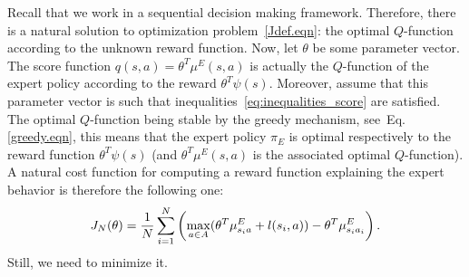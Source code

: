 \documentclass{article}
\begin{document}
Recall that we work in a sequential decision making framework.
Therefore, there is a natural solution to optimization
problem~\eqref{Jdef.eqn}: the optimal $Q$-function according to the
unknown reward function. Now, let $\theta$ be some parameter vector.
The score function $q(s,a) = \theta^T \mu^E(s,a)$ is actually the
$Q$-function of the expert policy according to the reward
$\theta^T\psi(s)$. Moreover, assume that this parameter vector is
such that inequalities~\eqref{eq:inequalities_score} are satisfied.
The optimal $Q$-function being stable by the greedy mechanism,
see~Eq.\eqref{greedy.eqn}, this means that the expert policy $\pi_E$
is optimal respectively to the reward function $\theta^T\psi(s)$
(and $\theta^T\mu^E(s,a)$ is the associated optimal $Q$-function). A
natural cost function for computing a reward function explaining the
expert behavior is therefore the following one:
\begin{equation}
\label{structure.eqn} J_N(\theta)  = {1\over N}
\sum_{i=1}^N\left(\max_{a\in A}(\theta ^T \mu^E_{s_ia} + l(s_i,a)) -
\theta ^T \mu^E_{s_ia_i} \right).
\end{equation}
Still, we need to minimize it.
\end{document}
